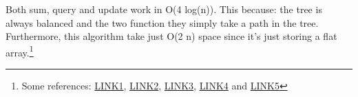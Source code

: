 \documentclass[a4paper]{article}
\begin{document}
Both sum, query and update work in O(4 log(n)). This because: the tree is always balanced and the two function they simply take a path in the tree. Furthermore, this algorithm take just O(2 n) space since it's just storing a flat array.\footnote{Some references: 
\href{https://www.cs.auckland.ac.nz/~peter-f/FTPfiles/TechRep88.pdf}{LINK1}, 
\href{https://www.hackerearth.com/practice/notes/binary-indexed-tree-made-easy-2/}{LINK2},
\href{https://kartikkukreja.wordpress.com/2013/12/02/range-updates-with-bit-fenwick-tree/}{LINK3},
\href{http://stackoverflow.com/questions/27875691/need-a-clear-explanation-of-range-updates-and-range-queries-binary-indexed-tree/27877427\#27877427}{LINK4} and 
\href{http://cs.stackexchange.com/questions/33014/range-update-range-query-with-binary-indexed-trees}{LINK5}}
\end{document}
